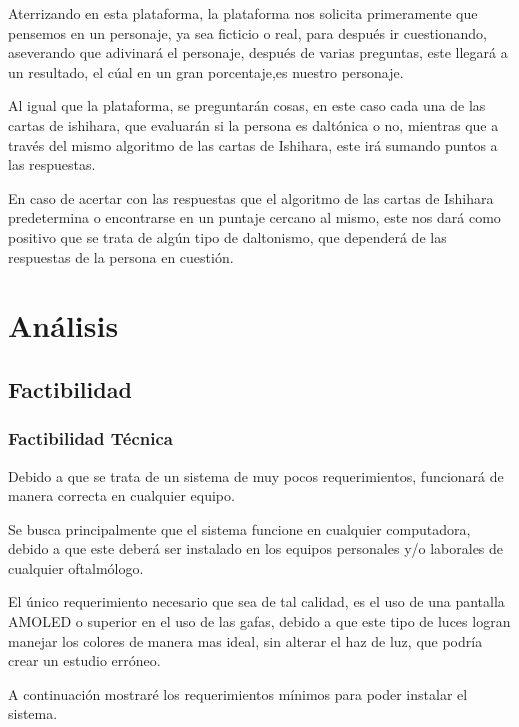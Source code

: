 \documentclass[10pt]{article}
\begin{document}
Aterrizando en esta plataforma, la plataforma nos solicita primeramente que pensemos en un personaje, ya sea ficticio o real, para después ir cuestionando, aseverando que adivinará el personaje, después de varias preguntas, este llegará a un resultado, el cúal en un gran porcentaje,es nuestro personaje.

Al igual que la plataforma, se preguntarán cosas, en este caso cada una de las cartas de ishihara, que evaluarán si la persona es daltónica o no, mientras que a través del mismo algoritmo de las cartas de Ishihara, este irá sumando puntos a las respuestas.

En caso de acertar con las respuestas que el algoritmo de las cartas de Ishihara predetermina o encontrarse en un puntaje cercano al mismo, este nos dará como positivo que se trata de algún tipo de daltonismo, que dependerá de las respuestas de la persona en cuestión.
\newpage
\section{Análisis}

\subsection{Factibilidad}
\subsubsection{Factibilidad Técnica}

Debido a que se trata de un sistema de muy pocos requerimientos, funcionará de manera correcta en cualquier equipo.

Se busca principalmente que el sistema funcione en cualquier computadora, debido a que este deberá ser instalado en los equipos personales y/o laborales de cualquier oftalmólogo.

El único requerimiento necesario que sea de tal calidad, es el uso de una pantalla AMOLED o superior en el uso de las gafas, debido a que este tipo de luces logran manejar los colores de manera mas ideal, sin alterar el haz de luz, que podría crear un estudio erróneo.

A continuación mostraré los requerimientos mínimos para poder instalar el sistema.
\end{document}
